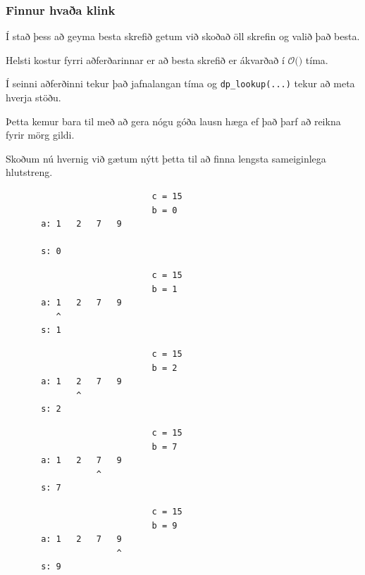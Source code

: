 {
	\frametitle{Finnur hvaða klink}
}

{
	{
		\item<1-> Í stað þess að geyma besta skrefið getum við skoðað öll skrefin og valið það besta.
	}
}

{
}

{
	{
		\item<1-> Helsti kostur fyrri aðferðarinnar er að besta skrefið er ákvarðað í $\mathcal{O}($$)$ tíma.
		\item<3-> Í seinni aðferðinni tekur það jafnalangan tíma og \texttt{dp\_lookup(...)} tekur að meta hverja stöðu.
		\item<4-> Þetta kemur bara til með að gera nógu góða lausn hæga ef það þarf að reikna fyrir mörg gildi.
		\item<5-> Skoðum nú hvernig við gætum nýtt þetta til að finna lengsta sameiginlega hlutstreng.
	}
}

{
}

{ \begin{verbatim}
                             c = 15
                             b = 0
       a: 1   2   7   9

       s: 0
\end{verbatim} }

{ \begin{verbatim}
                             c = 15
                             b = 1
       a: 1   2   7   9
          ^
       s: 1
\end{verbatim} }

{ \begin{verbatim}
                             c = 15
                             b = 2
       a: 1   2   7   9
              ^
       s: 2
\end{verbatim} }

{ \begin{verbatim}
                             c = 15
                             b = 7
       a: 1   2   7   9
                  ^
       s: 7
\end{verbatim} }

{ \begin{verbatim}
                             c = 15
                             b = 9
       a: 1   2   7   9
                      ^
       s: 9
\end{verbatim} }

